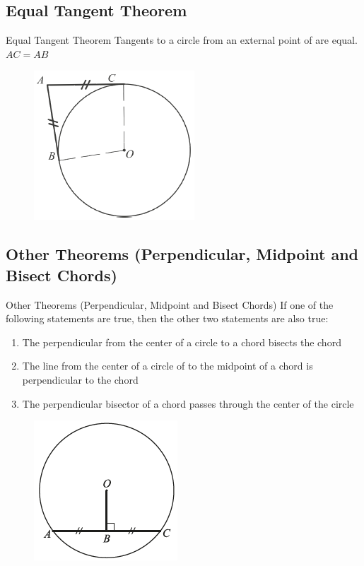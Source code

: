 \documentclass{beamer}
\begin{document}
\subsection{Equal Tangent Theorem}
\begin{frame}{Equal Tangent Theorem}
Tangents to a circle from an external point of are equal. $AC = AB$

\begin{figure}[h!]
	\centering
	\includegraphics[height=0.5\textheight]{Graphics/Week_13/EqualTangents.png}
\end{figure}
\end{frame}

\subsection{Other Theorems (Perpendicular, Midpoint and Bisect Chords)}
\begin{frame}{Other Theorems (Perpendicular, Midpoint and Bisect Chords)}
If one of the following statements are true, then the other two statements are also true:
\begin{enumerate}
    \item The perpendicular from the center of a circle to a chord bisects the chord
    \item The line from the center of a circle of to the midpoint of a chord is perpendicular to the chord
    \item The perpendicular bisector of a chord passes through the center of the circle
\end{enumerate}

\begin{figure}[h!]
	\centering
	\includegraphics[height=0.3\textheight]{Graphics/Week_13/MidBisectChord.png}
\end{figure}
\end{frame}
\end{document}
